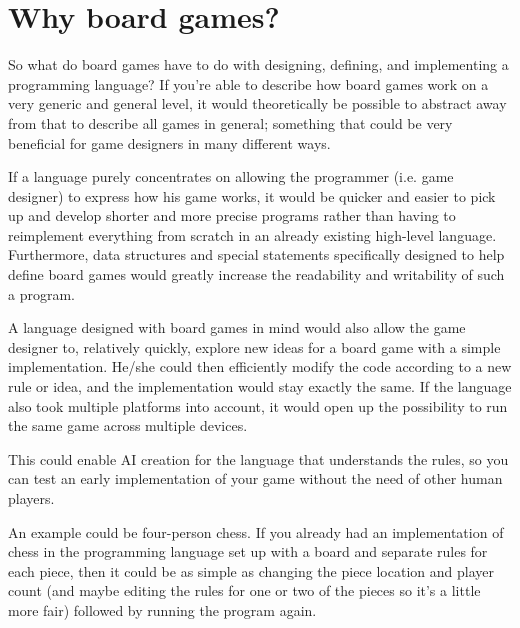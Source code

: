 \section{Why board games?}
So what do board games have to do with designing, defining, and implementing a programming language? If you're able to describe how board games work on a very generic and general level, it would theoretically be possible to abstract away from that to describe all games in general; something that could be very beneficial for game designers in many different ways.

If a language purely concentrates on allowing the programmer (i.e. game designer) to express how his game works, it would be quicker and easier to pick up and develop shorter and more precise programs rather than having to reimplement everything from scratch in an already existing high-level language. Furthermore, data structures and special statements specifically designed to help define board games would greatly increase the readability and writability of such a program.

A language designed with board games in mind would also allow the game designer to, relatively quickly, explore new ideas for a board game with a simple implementation. He/she could then efficiently modify the code according to a new rule or idea, and the implementation would stay exactly the same.  If the language also took multiple platforms into account, it would open up the possibility to run the same game across multiple devices.

This could enable AI creation for the language that understands the rules, so you can test an early implementation of your game without the need of other human players.

An example could be four-person chess. If you already had an implementation of chess in the programming language set up with a board and separate rules for each piece, then it could be as simple as changing the piece location and player count (and maybe editing the rules for one or two of the pieces so it's a little more fair) followed by running the program again.